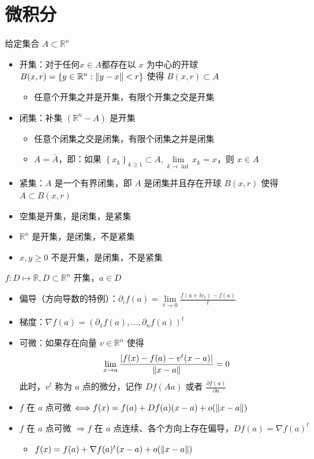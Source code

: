 \section{微积分}
\begin{remark}
    给定集合 $A \subset \mathbb{R}^n$\begin{itemize}
        \item 开集：对于任何$x \in A$都存在以 $x$ 为中心的开球 $B(x, r) = \left\{y \in \mathbb{R}^n: \norm{y - x} < r\right\}$ 使得 $B(x, r) \subset A$\begin{itemize}
            \item 任意个开集之并是开集，有限个开集之交是开集
        \end{itemize}
        \item 闭集：补集 $(\mathbb{R}^n - A)$ 是开集\begin{itemize}
            \item 任意个闭集之交是闭集，有限个闭集之并是闭集
            \item $A = \bar{A}$，即：如果 $\left\{x_k\right\}_{k \ge 1} \subset A,\underset{k \to \inf}{\lim}x_k = x$，则 $x \in A$
        \end{itemize}
        \item  紧集：$A$ 是一个有界闭集，即 $A$ 是闭集并且存在开球 $B(x, r)$ 使得 $A \subset B(x, r)$
        \item 空集是开集，是闭集，是紧集
        \item $\mathbb{R}^n$ 是开集，是闭集，不是紧集
        \item $x, y \ge 0$ 不是开集，是闭集，不是紧集
    \end{itemize}
\end{remark}

\begin{remark}
    $f: D \mapsto \mathbb{R}, D \subset \mathbb{R}^n$ 开集，$a \in D$\begin{itemize}
        \item 偏导（方向导数的特例）：$\partial_if(a) = \underset{t \to 0}{\lim}\frac{f(a + te_i) - f(a)}{t}$
        \item 梯度：$\nabla f(a) = (\partial_1f(a), \dots, \partial_nf(a))^t$
        \item 可微：如果存在向量 $v \in \mathbb{R}^n$ 使得\[\lim_{x \to a}\frac{|f(x) - f(a) - v^t(x - a)|}{\norm{x - a}} = 0\]此时，$v^t$ 称为 $a$ 点的微分，记作 $Df(Aa)$ 或者 $\frac{\partial f(a)}{\partial a}$
        \item $f$ 在 $a$ 点可微 $\Longleftrightarrow f(x) = f(a) + Df(a)(x - a) + o(\norm{x - a})$
        \item $f$ 在 $a$ 点可微 $\Longrightarrow f$ 在 $a$ 点连续、各个方向上存在偏导，$Df(a) = \nabla f(a)^t$\begin{itemize}
            \item $f(x) = f(a) + \nabla f(a)^t(x - a) + o(\norm{x - a})$
        \end{itemize} 
    \end{itemize}
\end{remark}

